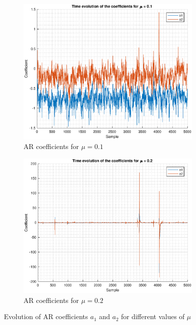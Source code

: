 \documentclass{article}
\begin{document}
\begin{figure}[h!]
\begin{subfigure}{0.33\textwidth}
\centering
\includegraphics[width = \textwidth]{ar_g1}
\caption{AR coefficients for $\mu=0.1$}
\label{fig:ar_g1}
\end{subfigure}
\begin{subfigure}{0.33\textwidth}
\centering
\includegraphics[width = \textwidth]{ar_g2}
\caption{AR coefficients for $\mu=0.2$}
\label{fig:ar_g2}
\end{subfigure}
\caption{Evolution of AR coefficients $a_1$ and $a_2$ for different values of $\mu$}
\label{ar_gain}
\end{figure}

\pagebreak
\end{document}
